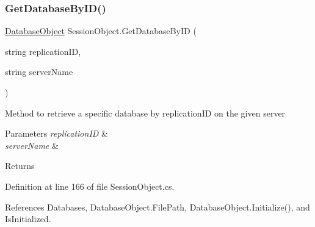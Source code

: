 \subsubsection{\texorpdfstring{Get\+Database\+By\+I\+D()}{GetDatabaseByID()}}
{\footnotesize\ttfamily \mbox{\hyperlink{class_database_object}{Database\+Object}} Session\+Object.\+Get\+Database\+By\+ID (\begin{DoxyParamCaption}\item[{string}]{replication\+ID,  }\item[{string}]{server\+Name }\end{DoxyParamCaption})}



Method to retrieve a specific database by replication\+ID on the given server 


\begin{DoxyParams}{Parameters}
{\em replication\+ID} & \\
\hline
{\em server\+Name} & \\
\hline
\end{DoxyParams}
\begin{DoxyReturn}{Returns}

\end{DoxyReturn}


Definition at line 166 of file Session\+Object.\+cs.



References Databases, Database\+Object.\+File\+Path, Database\+Object.\+Initialize(), and Is\+Initialized.



